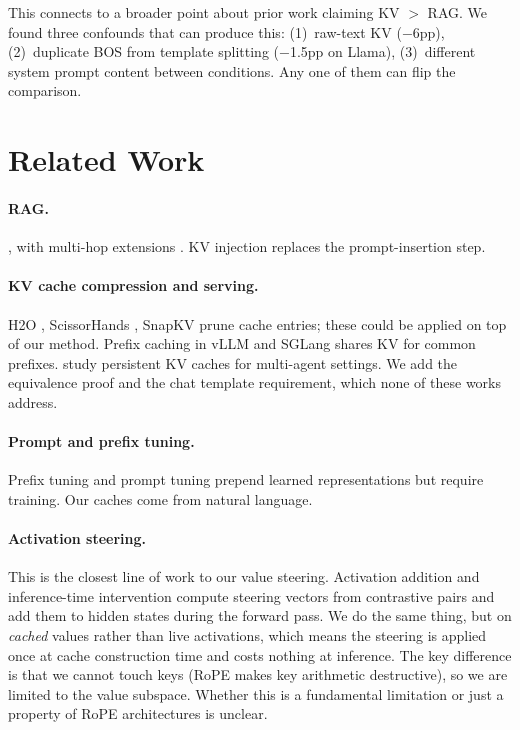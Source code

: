 \documentclass{article}
\begin{document}
This connects to a broader point about prior work claiming KV $>$ RAG. We found three confounds that can produce this: (1)~raw-text KV ($-$6pp), (2)~duplicate BOS from template splitting ($-$1.5pp on Llama), (3)~different system prompt content between conditions. Any one of them can flip the comparison.

\section{Related Work}

\paragraph{RAG.} \citet{lewis2020rag, guu2020realm}, with multi-hop extensions \citep{trivedi2023interleaving, press2023measuring, asai2024selfrag}. KV injection replaces the prompt-insertion step.

\paragraph{KV cache compression and serving.} H2O \citep{zhang2023h2o}, ScissorHands \citep{liu2024scissorhands}, SnapKV \citep{li2024snapkv} prune cache entries; these could be applied on top of our method. Prefix caching in vLLM \citep{kwon2023vllm} and SGLang \citep{zheng2024sglang} shares KV for common prefixes. \citet{shkolnikov2026agent} study persistent KV caches for multi-agent settings. We add the equivalence proof and the chat template requirement, which none of these works address.

\paragraph{Prompt and prefix tuning.} Prefix tuning \citep{li2021prefix} and prompt tuning \citep{lester2021prompt} prepend learned representations but require training. Our caches come from natural language.

\paragraph{Activation steering.} This is the closest line of work to our value steering. Activation addition \citep{turner2023activation} and inference-time intervention \citep{li2024inference} compute steering vectors from contrastive pairs and add them to hidden states during the forward pass. We do the same thing, but on \textit{cached} values rather than live activations, which means the steering is applied once at cache construction time and costs nothing at inference. The key difference is that we cannot touch keys (RoPE makes key arithmetic destructive), so we are limited to the value subspace. Whether this is a fundamental limitation or just a property of RoPE architectures is unclear.
\end{document}
